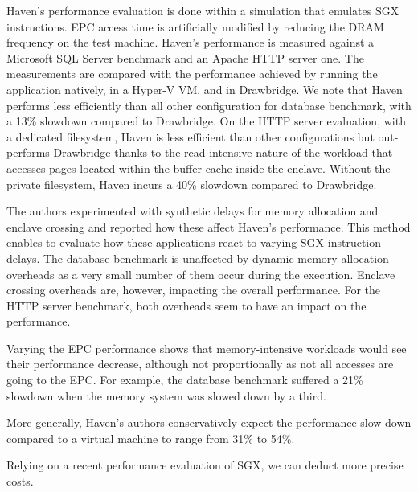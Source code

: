 %
Haven's performance evaluation is done within a simulation that emulates SGX instructions.
EPC access time is artificially modified by reducing the DRAM frequency on the test machine.
Haven's performance is measured against a Microsoft SQL Server benchmark and an Apache HTTP server one.
The measurements are compared with the performance achieved by running the application natively, in a Hyper-V VM, and in Drawbridge.
We note that Haven performs less efficiently than all other configuration for database benchmark, with a 13\% slowdown compared to Drawbridge.
On the HTTP server evaluation, with a dedicated filesystem, Haven is less efficient than other configurations but out-performs Drawbridge thanks to the read intensive nature of the workload that accesses pages located within the buffer cache inside the enclave.
Without the private filesystem, Haven incurs a 40\% slowdown compared to Drawbridge.

The authors experimented with synthetic delays for memory allocation and enclave crossing and reported how these affect Haven's performance.
This method enables to evaluate how these applications react to varying SGX instruction delays.
The database benchmark is unaffected by dynamic memory allocation overheads as a very small number of them occur during the execution.
Enclave crossing overheads are, however, impacting the overall performance.
For the HTTP server benchmark, both overheads seem to have an impact on the performance.

Varying the EPC performance shows that memory-intensive workloads would see their performance decrease, although not proportionally as not all accesses are going to the EPC.
For example, the database benchmark suffered a 21\% slowdown when the memory system was slowed down by a third.

More generally, Haven's authors conservatively expect the performance slow down compared to a virtual machine to range from 31\% to 54\%.

Relying on a recent performance evaluation of SGX, we can deduct more precise costs.
